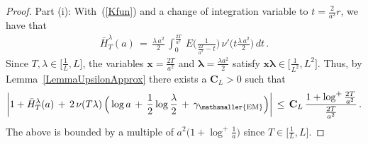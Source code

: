 \documentclass[10pt]{article}
\numberwithin{equation}{section}
\theoremstyle{definition}
\begin{document}
\begin{proof} Part (i):  With~(\ref{Kfun}) and a change of integration variable to $t= \frac{2}{a^2}r $,  we have that
\begin{align*}
\bar{H}^{\lambda}_T(a) \,=\, \frac{\lambda \, a^2}{ 2
}\,\int_0^{\frac{2T }{ a^2 } }\,E\bigg(\frac{1}{\frac{2T}{a^2} -t }  \bigg) \,\nu'\bigg(t\frac{\lambda\,  a^2}{ 2
}\bigg)\,dt \,.
\end{align*}
Since $ T,\lambda  \in \big[\frac{1}{L}, L\big]$, the variables  $\mathbf{x}=\frac{2T}{a^2}$ and $\boldsymbol{\lambda}= \frac{ \lambda a^2  }{ 2 }$ satisfy  $\mathbf{x}\boldsymbol{\lambda}  \in \big[\frac{1}{L^2}, L^2\big]$. Thus, by Lemma~\ref{LemmaUpsilonApprox} there exists a $\mathbf{C}_L>0$ such that 
\begin{align*}
\bigg| 1+\bar{H}^{\lambda}_T(a)\, + \,2\,\nu( T\lambda  )\,\Big(\log a\,+\,  \frac{1}{2}\log \frac{ \lambda  }{ 2  }  \,+\, \gamma_{\mathsmaller{\textup{EM}}}  \Big)   \bigg| \,\leq \,   \mathbf{C}_L \,\frac{1+\log^+ \frac{2T}{a^2}  }{ \frac{2T}{a^2}   } \,.
\end{align*}
The above is bounded by a multiple of  $a^2 \big( 1+\log^+ \frac{1}{a}  \big)$ since $T\in  \big[\frac{1}{L},  L\big]$. \vspace{.2cm}


\end{proof}
\end{document}
